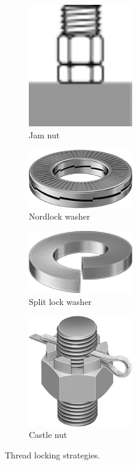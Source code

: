 \documentclass[10pt,letterpaper]{book}
\begin{document}
\begin{figure}[H]
		\begin{subfigure}[b]{.24\linewidth}
			\includegraphics[width=0.5\textwidth]{imgs/jamnut.png}
			\caption{Jam nut}
		\end{subfigure}\begin{subfigure}[b]{.24\linewidth}
			\includegraphics[width=0.5\textwidth]{imgs/nordlock.png}
			\caption{Nordlock washer}
		\end{subfigure}\begin{subfigure}[b]{.24\linewidth}
			\includegraphics[width=0.5\textwidth]{imgs/splitlock.png}
			\caption{Split lock washer}
		\end{subfigure}\begin{subfigure}[b]{.24\linewidth}
			\includegraphics[width=0.5\textwidth]{imgs/castlenut.png}
			\caption{Castle nut}
		\end{subfigure}
		\caption{Thread locking strategies.}
	\end{figure}
	
\end{document}
